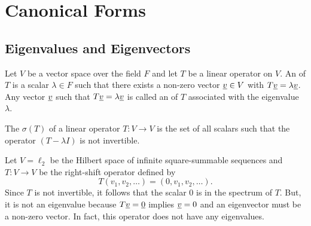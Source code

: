 \chapter{Canonical Forms}


\section{Eigenvalues and Eigenvectors}

\begin{definition}
Let $V$ be a vector space over the field $F$ and let $T$ be a linear operator on $V$.
An  of $T$ is a scalar $\lambda \in F$ such that there exists a non-zero vector $\underline{v} \in V$ with $T \underline{v} = \lambda \underline{v}$.
Any vector $\underline{v}$ such that $T \underline{v} = \lambda \underline{v}$ is called an  of $T$ associated with the eigenvalue $\lambda$.
\end{definition}

\begin{definition}
The  $\sigma(T)$ of a linear operator $T \colon V \rightarrow V$ is the set of all scalars such that the operator $(T-\lambda I)$ is not invertible.
\end{definition}

\begin{example}
Let $V=\ell_2$ be the Hilbert space of infinite square-summable sequences and $T:V\rightarrow V$ be the right-shift operator defined by
\[ T (v_1,v_2,\ldots) = (0,v_1,v_2,\ldots). \]
Since $T$ is not invertible, it follows that the scalar $0$ is in the spectrum of $T$.
But, it is not an eigenvalue because $T \underline{v} = \underline{0}$ implies $\underline{v} = 0$ and an eigenvector must be a non-zero vector.
In fact, this operator does not have any eigenvalues.
\end{example}

